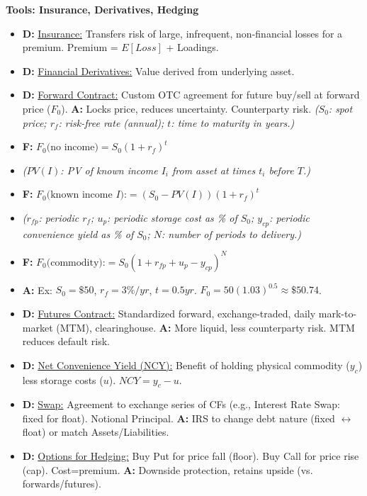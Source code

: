 \documentclass[7pt,landscape]{extarticle} %
\newcommand{\cheatsheetsubsubsection}[1]{%
  \vspace{0.15ex plus 0.05ex minus 0.05ex}%
  \noindent\textbf{\sffamily\scriptsize #1}%
  \par\vspace{0.05ex}%
}
\newcommand{\D}[1]{\textbf{\textcolor{DefColor}{D:}} \uline{#1}}
\newcommand{\F}[1]{\textbf{\textcolor{FormColor}{F:}} #1}
\newcommand{\A}[1]{\textbf{\textcolor{AppColor}{A:}} #1}
\newcommand{\SF}[1]{\textit{\small (#1)}} %
\begin{document}
\begin{multicols*}{4}
  \cheatsheetsubsubsection{Tools: Insurance, Derivatives, Hedging}
  \begin{itemize}
    \item \D{Insurance:} Transfers risk of large, infrequent, non-financial losses for a premium. Premium = $E[Loss]$ + Loadings.
    \item \D{Financial Derivatives:} Value derived from underlying asset.
    \item \D{Forward Contract:} Custom OTC agreement for future buy/sell at forward price ($F_0$). \A{Locks price, reduces uncertainty. Counterparty risk.}
          \SF{$S_0$: spot price; $r_f$: risk-free rate (annual); $t$: time to maturity in years.}
    \item \F{$F_0 \text{(no income)} = S_0(1+r_f)^t$}
    \item \SF{$PV(I)$: PV of known income $I_i$ from asset at times $t_i$ before $T$.}
    \item \F{$F_0 \text{(known income } I \text{):} = (S_0 - PV(I))(1+r_f)^t$}
    \item \SF{$r_{fp}$: periodic $r_f$; $u_p$: periodic storage cost as \% of $S_0$; $y_{cp}$: periodic convenience yield as \% of $S_0$; $N$: number of periods to delivery.}
    \item \F{$F_0 \text{(commodity):} = S_0(1+r_{fp}+u_p-y_{cp})^N$}
    \item \A{Ex: $S_0=\$50$, $r_f=3\%/yr$, $t=0.5yr$. $F_0=50(1.03)^{0.5} \approx \$50.74$.}
    \item \D{Futures Contract:} Standardized forward, exchange-traded, daily mark-to-market (MTM), clearinghouse. \A{More liquid, less counterparty risk. MTM reduces default risk.}
    \item \D{Net Convenience Yield (NCY):} Benefit of holding physical commodity ($y_c$) less storage costs ($u$). $NCY = y_c - u$.
    \item \D{Swap:} Agreement to exchange series of CFs (e.g., Interest Rate Swap: fixed for float). Notional Principal. \A{IRS to change debt nature (fixed $\leftrightarrow$ float) or match Assets/Liabilities.}
    \item \D{Options for Hedging:} Buy Put for price fall (floor). Buy Call for price rise (cap). Cost=premium. \A{Downside protection, retains upside (vs. forwards/futures).}
  \end{itemize}
  

\end{multicols*}
\end{document}

